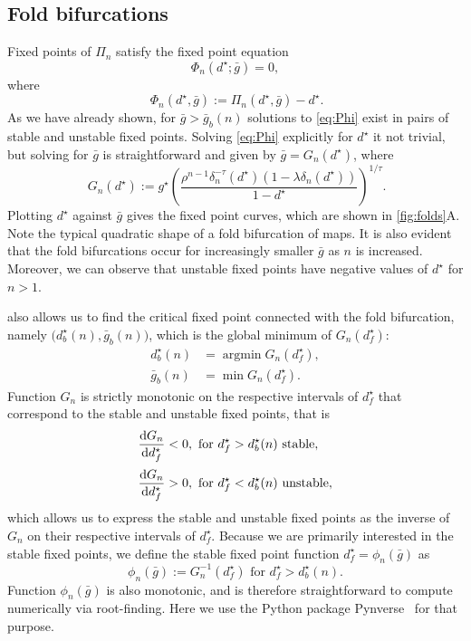 \documentclass[utf8]{frontiersFPHY} %
\newcommand{\dstar}{d^\star}
\newcommand{\gbar}{\bar g}
\begin{document}
\subsection{Fold bifurcations}
Fixed points of $\Pi_n$ satisfy the fixed point equation
\begin{equation}
  \label{eq:Phi}
  \Phi_n(\dstar; \gbar)=0,
\end{equation}
where
\begin{equation}
 ~\label{eq:Phi-def}
  \Phi_{n}(d^{\star}, \gbar):=\Pi_{n}(d^{\star}, \gbar)-d^{\star}.
\end{equation}
As we have already shown, for $\gbar > \gbar_b(n)$ solutions to \cref{eq:Phi} exist in pairs of stable and unstable fixed points.
Solving \cref{eq:Phi} explicitly for $\dstar$ it not trivial, but solving for $\gbar$ is straightforward and given by $\gbar = G_n(\dstar)$, where
\begin{equation}
 ~\label{eq:g}
  G_{n}(d^{\star}) := g^{\star} \left(\frac{\rho^{n-1}\delta_{n}^{-\tau}(d^{\star})(1-\lambda\delta_{n}(d^{\star}))}{1-d^{\star}}\right)^{1/\tau}.
\end{equation}
Plotting $d^{\star}$ against $\gbar$ gives the fixed point curves, which are shown in \cref{fig:folds}A.
Note the typical quadratic shape of a fold bifurcation of maps.
It is also evident that the fold bifurcations occur for increasingly smaller $\gbar$ as $n$ is increased.
Moreover, we can observe that unstable fixed points have negative values of $d^{\star}$ for $n>1$.

 also allows us to find the critical fixed point connected with the fold bifurcation, namely $\big(\dstar_{b}(n), \gbar_{b}(n)\big)$, which is the global minimum of $G_{n}(\dstar_f)$:
\begin{align}
  \dstar_{b}(n) &= \operatorname{argmin} G_{n}(\dstar_{f}),\\
  \gbar_{b}(n)  &= \min{G_{n}(\dstar_{f})}.
\end{align}
Function $G_{n}$ is strictly monotonic on the respective intervals of $\dstar_f$ that correspond to the stable and unstable fixed points, that is
\begin{align}
  \dv{G_n}{\dstar_f}& < 0, \text{ for } \dstar_f>\dstar_b(n) \text{ stable},\\[0.5ex]
  \dv{G_n}{\dstar_f}& > 0, \text{ for } \dstar_f<\dstar_b(n) \text{ unstable},
\end{align}
which allows us to express the stable and unstable fixed points as the inverse of $G_n$ on their respective intervals of $\dstar_f$.
Because we are primarily interested in the stable fixed points, we define the stable fixed point function $\dstar_f=\phi_n(\gbar)$ as
\begin{equation}
  \label{eq:phi}
  \phi_{n}(\gbar):= G_{n}^{-1}(\dstar_{f}) \text{ for } \dstar_{f}>\dstar_{b}(n).
\end{equation}
Function $\phi_n(\gbar)$ is also monotonic, and is therefore straightforward to compute numerically via root-finding.
Here we use the Python package Pynverse~\citep{pynverse} for that purpose.
\end{document}
